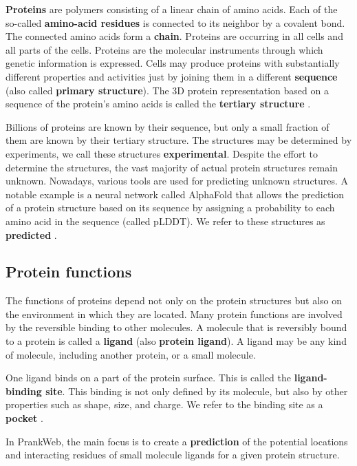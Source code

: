 \textbf{Proteins} are polymers consisting of a linear chain of amino acids. Each of the so-called \textbf{amino-acid residues} is connected to its neighbor by a covalent bond. The connected amino acids form a \textbf{chain}. Proteins are occurring in all cells and all parts of the cells. Proteins are the molecular instruments through which genetic information is expressed. Cells may produce proteins with substantially different properties and activities just by joining them in a different \textbf{sequence} (also called \textbf{primary structure}). The 3D protein representation based on a sequence of the protein's amino acids is called the \textbf{tertiary structure} \cite{nelson2008lehninger}.

Billions of proteins are known by their sequence, but only a small fraction of them are known by their tertiary structure. The structures may be determined by experiments, we call these structures \textbf{experimental}. Despite the effort to determine the structures, the vast majority of actual protein structures remain unknown. Nowadays, various tools are used for predicting unknown structures. A notable example is a neural network called AlphaFold that allows the prediction of a protein structure based on its sequence by assigning a probability to each amino acid in the sequence (called pLDDT). We refer to these structures as \textbf{predicted} \cite{jumper2021highly}.

\subsection{Protein functions}
\label{subsec:protein_functions}

The functions of proteins depend not only on the protein structures but also on the environment in which they are located. Many protein functions are involved by the reversible binding to other molecules. A molecule that is reversibly bound to a protein is called a \textbf{ligand} (also \textbf{protein ligand}). A ligand may be any kind of molecule, including another protein, or a small molecule.

One ligand binds on a part of the protein surface. This is called the \textbf{ligand-binding site}. This binding is not only defined by its molecule, but also by other properties such as shape, size, and charge. We refer to the binding site as a \textbf{pocket} \cite{nelson2008lehninger}.

In PrankWeb, the main focus is to create a \textbf{prediction} of the potential locations and interacting residues of small molecule ligands for a given protein structure. 

